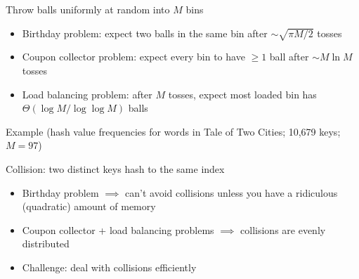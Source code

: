 \documentclass[8pt,a4paper,compress]{beamer}
\begin{document}
\begin{frame}[fragile]
\pause

Throw balls uniformly at random into $M$ bins
\begin{itemize}
\item Birthday problem: expect two balls in the same bin after $\sim \sqrt{\pi M / 2}$ tosses

\item Coupon collector problem: expect every bin to have $\geq 1$ ball after $\sim M \ln M$ tosses

\item Load balancing problem: after $M$ tosses, expect most loaded bin has $\Theta(\log M / \log \log M)$ balls
\end{itemize}

\pause
\bigskip

Example (hash value frequencies for words in Tale of Two Cities; 10,679 keys; $M = 97$)

\begin{center}
\end{center}

\pause
\bigskip

Collision: two distinct keys hash to the same index
\begin{itemize}
\item Birthday problem $\implies$ can't avoid collisions unless you have a ridiculous (quadratic) amount of memory

\item Coupon collector + load balancing problems $\implies$ collisions are evenly distributed

\item Challenge: deal with collisions efficiently
\end{itemize}
\end{frame}
\end{document}
